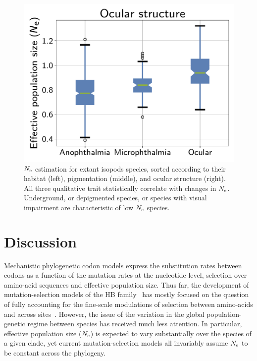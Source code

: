 \documentclass{article}
\begin{document}
\begin{figure}[t]
        \hfill
        \begin{minipage}{0.32\linewidth}
            \includegraphics[width=\linewidth, page=1]{isopods/12CDS_SiteMutSelBranchNe_Rep_LogPopulationSize_eye_merged}
        \end{minipage}
        \hfill
        \caption[$\Ne$ as a function of traits in isopods]{
            $\Ne$ estimation for extant isopods species, sorted according to their habitat (left), pigmentation (middle), and ocular structure (right).
            All three qualitative trait statistically correlate with changes in $\Ne$.
            Underground, or depigmented species, or species with visual impairment are characteristic of low $\Ne$ species.}
        \label{fig:isopods_correlation}
    \end{figure}


    \section{Discussion}
    \label{sec:Discussion}
    Mechanistic phylogenetic {codon} models express the {substitution} rates between codons as a function of the mutation rates at the nucleotide level, selection over amino-acid sequences and {effective population size}.
    Thus far, the development of mutation-selection models of the {HB} family~\citep{Rodrigue2010, Tamuri2012} has mostly focused on the question of fully accounting for the fine-scale modulations of selection between amino-acids and across sites~\citep{Rodrigue2010, Tamuri2012}.
    However, the issue of the variation in the global population-genetic regime between species has received much less attention.
    In particular, {effective population size} ($\Ne$) is expected to vary substantially over the species of a given clade, yet current mutation-selection models all invariably assume $\Ne$ to be constant across the phylogeny.
\end{document}
